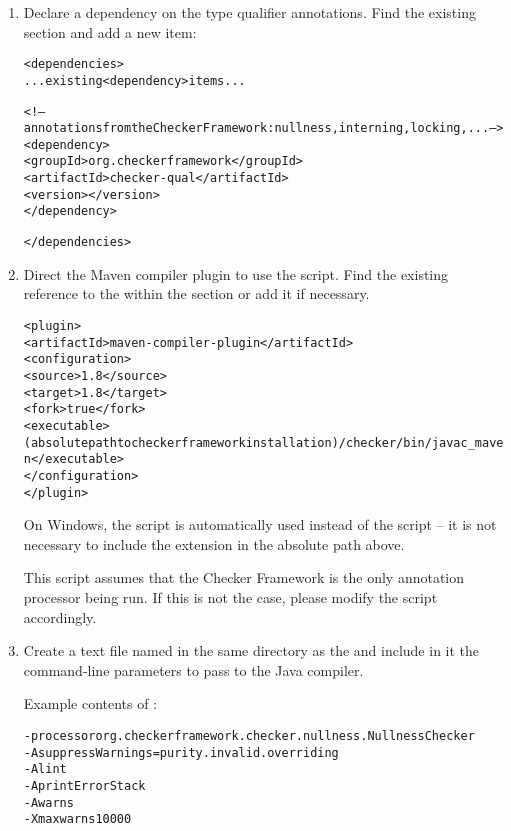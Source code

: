 \begin{enumerate}

\item Declare a dependency on the type qualifier annotations.  Find the
  existing  section and add a new
   item:

\begin{alltt}
    <dependencies>
        ... existing <dependency> items ...

        <!-- annotations from the Checker Framework: nullness, interning, locking, ... -->
        <dependency>
            <groupId>org.checkerframework</groupId>
            <artifactId>checker-qual</artifactId>
            <version>\ReleaseVersion{}</version>
        </dependency>

    </dependencies>
\end{alltt}

\item Direct the Maven compiler plugin to use the  script. Find
the existing reference to the  within the 
section or add it if necessary.

\begin{alltt}
      <plugin>
        <artifactId>maven-compiler-plugin</artifactId>
        <configuration>
          <source>1.8</source>
          <target>1.8</target>
          <fork>true</fork>
          <executable>(absolute path to checker framework installation)/checker/bin/javac_maven</executable>
        </configuration>
      </plugin>
\end{alltt}

On Windows, the  script is automatically used instead
of the  script -- it is not necessary to include the 
extension in the absolute path above.

This script assumes that the Checker Framework is the only annotation processor being run.
If this is not the case, please modify the  script accordingly.

\item Create a text file named  in the same directory as the 
and include in it the command-line parameters to pass to the Java compiler.

Example contents of :

\begin{alltt}
-processor org.checkerframework.checker.nullness.NullnessChecker
-AsuppressWarnings=purity.invalid.overriding
-Alint
-AprintErrorStack
-Awarns
-Xmaxwarns 10000
\end{alltt}


\end{enumerate}
